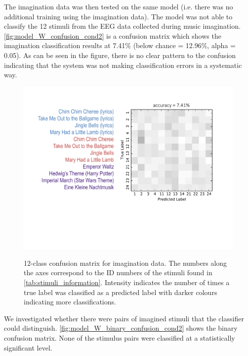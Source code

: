 The imagination data was then tested on the same model (i.e. there was no additional training using the imagination data). 
The model was not able to classify the 12 stimuli from the EEG data collected during music imagination. 
\autoref{fig:model_W_confusion_cond2} is a confusion matrix which shows the imagination classification results at 7.41\% (below chance = 12.96\%, alpha = 0.05). 
As can be seen in the figure, there is no clear pattern to the confusion indicating that the system was not making classification errors in a systematic way. 
\begin{figure}[htb] 
  \begin{center}
    \includegraphics[width=.83\textwidth,keepaspectratio=true]{Figures/model_W_confusion_cond2}
   \\\vspace{-0.8em}
    \caption{12-class confusion matrix for imagination data. The numbers along the axes correspond to the ID numbers of the stimuli found in \autoref{tab:stimuli_information}. Intensity indicates the number of times a true label was classified as a predicted label with darker colours indicating more classifications.}
        \label{fig:model_W_confusion_cond2}
  \end{center}
  \vspace{-1em}
\end{figure}

We investigated whether there were pairs of imagined stimuli that the classifier could distinguish.
\autoref{fig:model_W_binary_confusion_cond2} shows the binary confusion matrix.
None of the stimulus pairs were classified at a statistically significant level. 

